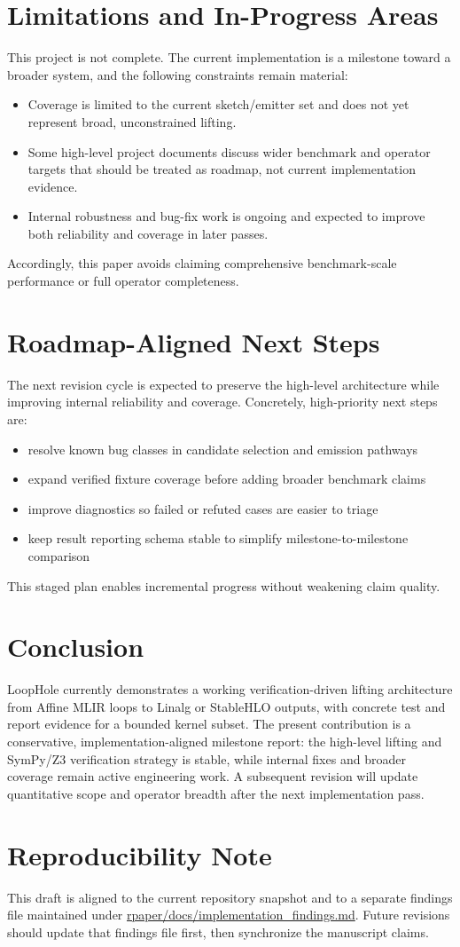 \documentclass[conference]{IEEEtran}
\begin{document}
\section{Limitations and In-Progress Areas}
This project is not complete. The current implementation is a milestone toward a broader system, and the following constraints remain material:
\begin{itemize}
\item Coverage is limited to the current sketch/emitter set and does not yet represent broad, unconstrained lifting.
\item Some high-level project documents discuss wider benchmark and operator targets that should be treated as roadmap, not current implementation evidence.
\item Internal robustness and bug-fix work is ongoing and expected to improve both reliability and coverage in later passes.
\end{itemize}

Accordingly, this paper avoids claiming comprehensive benchmark-scale performance or full operator completeness.

\section{Roadmap-Aligned Next Steps}
The next revision cycle is expected to preserve the high-level architecture while improving internal reliability and coverage. Concretely, high-priority next steps are:
\begin{itemize}
\item resolve known bug classes in candidate selection and emission pathways
\item expand verified fixture coverage before adding broader benchmark claims
\item improve diagnostics so failed or refuted cases are easier to triage
\item keep result reporting schema stable to simplify milestone-to-milestone comparison
\end{itemize}

This staged plan enables incremental progress without weakening claim quality.

\section{Conclusion}
LoopHole currently demonstrates a working verification-driven lifting architecture from Affine MLIR loops to Linalg or StableHLO outputs, with concrete test and report evidence for a bounded kernel subset. The present contribution is a conservative, implementation-aligned milestone report: the high-level lifting and SymPy/Z3 verification strategy is stable, while internal fixes and broader coverage remain active engineering work. A subsequent revision will update quantitative scope and operator breadth after the next implementation pass.

\section*{Reproducibility Note}
This draft is aligned to the current repository snapshot and to a separate findings file maintained under \url{rpaper/docs/implementation_findings.md}. Future revisions should update that findings file first, then synchronize the manuscript claims.
\end{document}
